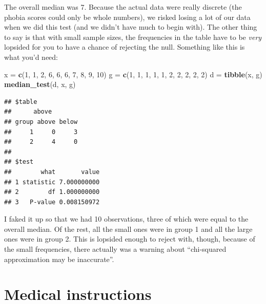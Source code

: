 \documentclass[]{tufte-book}
\newenvironment{Shaded}{}{}
\newcommand{\DecValTok}[1]{\textcolor[rgb]{0.25,0.63,0.44}{#1}}
\newcommand{\KeywordTok}[1]{\textcolor[rgb]{0.00,0.44,0.13}{\textbf{#1}}}
\newcommand{\NormalTok}[1]{#1}
\newcommand{\StringTok}[1]{\textcolor[rgb]{0.25,0.44,0.63}{#1}}
\theoremstyle{definition}
\theoremstyle{definition}
\theoremstyle{definition}
\theoremstyle{remark}
\begin{document}
The overall median was 7. Because the actual data were really discrete
(the phobia scores could only be whole numbers), we risked losing a lot
of our data when we did this test (and we didn't have much to begin
with). The other thing to say is that with small sample sizes, the
frequencies in the table have to be \emph{very} lopsided for you to have
a chance of rejecting the null. Something like this is what you'd need:

\begin{Shaded}
\begin{Highlighting}[]
\NormalTok{x =}\StringTok{ }\KeywordTok{c}\NormalTok{(}\DecValTok{1}\NormalTok{, }\DecValTok{1}\NormalTok{, }\DecValTok{2}\NormalTok{, }\DecValTok{6}\NormalTok{, }\DecValTok{6}\NormalTok{, }\DecValTok{6}\NormalTok{, }\DecValTok{7}\NormalTok{, }\DecValTok{8}\NormalTok{, }\DecValTok{9}\NormalTok{, }\DecValTok{10}\NormalTok{)}
\NormalTok{g =}\StringTok{ }\KeywordTok{c}\NormalTok{(}\DecValTok{1}\NormalTok{, }\DecValTok{1}\NormalTok{, }\DecValTok{1}\NormalTok{, }\DecValTok{1}\NormalTok{, }\DecValTok{1}\NormalTok{, }\DecValTok{2}\NormalTok{, }\DecValTok{2}\NormalTok{, }\DecValTok{2}\NormalTok{, }\DecValTok{2}\NormalTok{, }\DecValTok{2}\NormalTok{)}
\NormalTok{d =}\StringTok{ }\KeywordTok{tibble}\NormalTok{(x, g)}
\KeywordTok{median_test}\NormalTok{(d, x, g)}
\end{Highlighting}
\end{Shaded}

\begin{verbatim}
## $table
##      above
## group above below
##     1     0     3
##     2     4     0
## 
## $test
##        what       value
## 1 statistic 7.000000000
## 2        df 1.000000000
## 3   P-value 0.008150972
\end{verbatim}

I faked it up so that we had 10 observations, three of which were equal
to the overall median. Of the rest, all the small ones were in group 1
and all the large ones were in group 2. This is lopsided enough to
reject with, though, because of the small frequencies, there actually
was a warning about ``chi-squared approximation may be inaccurate''.

\hypertarget{medical-instructions}{%
\section{Medical instructions}\label{medical-instructions}}
\end{document}
